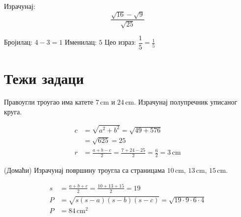 \documentclass[11pt,a5paper,twoside,addpoints,noanswers]{exam} %
\newcommand{\measure}[2]{\mathrm{#1\,#2}}
\newcommand{\variant}[3]{#1}
\begin{document}
\begin{questions}
\question[3]
Израчунај:
\[
\dfrac{\sqrt{\variant{16}{49}{36}}-\sqrt{\variant{9}{25}{4}}}{\sqrt{\variant{25}{4}{49}}}
\]
\begin{solution}[\stretch 3]
Бројилац: $\variant{4-3}{7-5}{6-2}=\variant{1}{2}{4}$  
Именилац: $\variant{5}{2}{7}$  
Цео израз: $\dfrac{\variant{1}{2}{4}}{\variant{5}{2}{7}}=\variant{\tfrac{1}{5}}{1}{\tfrac{4}{7}}$
\end{solution}

\ifprintanswers\else\newpage\fi

\section{Тежи задаци}

\question[5]
Правоугли троугао има катете
$\measure{\variant{7}{15}{20}}{cm}$ и
$\measure{\variant{24}{8}{21}}{cm}$.  
Израчунај полупречник уписаног круга.
\begin{solution}[\stretch 3]
\begin{align*}
c &= \sqrt{a^2+b^2}=\sqrt{\variant{49+576}{225+64}{400+441}}\\
&=\sqrt{\variant{625}{289}{841}}=\variant{25}{17}{29}\\
r &= \tfrac{a+b-c}{2}=\tfrac{\variant{7+24-25}{15+8-17}{20+21-29}}{2}
=\tfrac{6}{2}=\measure{3}{cm}
\end{align*}
\end{solution}

\question[5]
(Домаћи) Израчунај површину троугла са страницама
$\measure{\variant{10}{7}{9}}{cm}$,
$\measure{\variant{13}{24}{12}}{cm}$,
$\measure{\variant{15}{25}{18}}{cm}$.
\begin{solution}[\stretch 4]
\begin{align*}
s &= \tfrac{a+b+c}{2}=\tfrac{\variant{10+13+15}{7+24+25}{9+12+18}}{2}
=\variant{19}{28}{19,5}\\
P &= \sqrt{s(s-a)(s-b)(s-c)}
=\sqrt{\variant{19\cdot9\cdot6\cdot4}{28\cdot21\cdot4\cdot3}{19,5\cdot10,5\cdot7,5\cdot1,5}}\\
P &= \measure{\variant{84}{84}{\approx56,1}}{cm^2}
\end{align*}
\end{solution}

\end{questions}
\end{document}
